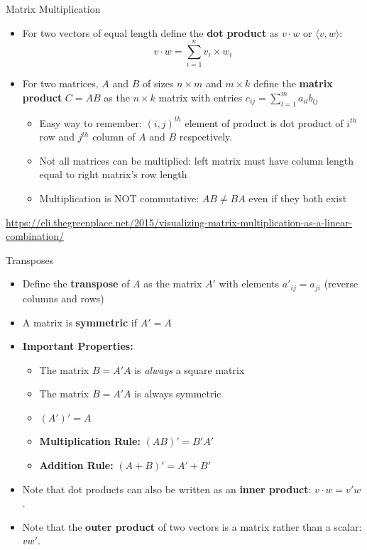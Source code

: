 \begin{frame}{Matrix Multiplication}
	\begin{itemize}
		\item For two vectors of equal length define the {\bf dot product} as $v\cdot w$ or $\langle v, w \rangle$:
			\[
				v\cdot w = \sum_{i=1}^n v_i\times w_i
			\]
		\item For two matrices, $A$ and $B$ of sizes $n\times m$ and $m\times k$ define the {\bf matrix product} $C=AB$ as the $n\times k$ matrix with entries $c_{ij}=\sum_{l=1}^ma_{il}b_{lj}$
		\begin{itemize}
			\item Easy way to remember: $(i,j)^{th}$ element of product is dot product of $i^{th}$ row and $j^{th}$ column of $A$ and $B$ respectively.
			\item Not all matrices can be multiplied: left matrix must have column length equal to right matrix's row length
			\item Multiplication is NOT commutative: $AB\ne BA$ even if they both exist
		\end{itemize}
	\end{itemize}
	\url{https://eli.thegreenplace.net/2015/visualizing-matrix-multiplication-as-a-linear-combination/}
\end{frame}


\begin{frame}{Transposes}
\begin{itemize}	
	\item Define the {\bf transpose} of $A$ as the matrix $A'$ with elements $a'_{ij} = a_{ji}$ (reverse columns and rows)
	\item A matrix is {\bf symmetric} if $A'=A$
	\item {\bf Important Properties:}
		\begin{itemize}
			\item The matrix $B = A'A$ is \emph{always} a square matrix
			\item The matrix $B=A'A$ is always symmetric
			\item $(A')' = A$
			\item {\bf Multiplication Rule:} $(AB)' = B'A'$
			\item {\bf Addition Rule:} $(A+B)' = A'+B'$
		\end{itemize}
	\item Note that dot products can also be written as an {\bf inner product}: $v\cdot w = v' w$.
	\item Note that the {\bf outer product} of two vectors is a matrix rather than a scalar: $v w'$.

\end{itemize}

\end{frame}

